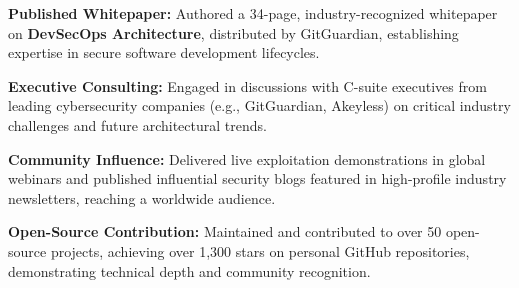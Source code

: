 \item \textbf{Published Whitepaper:} Authored a 34-page, industry-recognized whitepaper on \textbf{DevSecOps Architecture}, distributed by GitGuardian, establishing expertise in secure software development lifecycles.
\item \textbf{Executive Consulting:} Engaged in discussions with C-suite executives from leading cybersecurity companies (e.g., GitGuardian, Akeyless) on critical industry challenges and future architectural trends.
\item \textbf{Community Influence:} Delivered live exploitation demonstrations in global webinars and published influential security blogs featured in high-profile industry newsletters, reaching a worldwide audience.
\item \textbf{Open-Source Contribution:} Maintained and contributed to over 50 open-source projects, achieving over 1,300 stars on personal GitHub repositories, demonstrating technical depth and community recognition.
